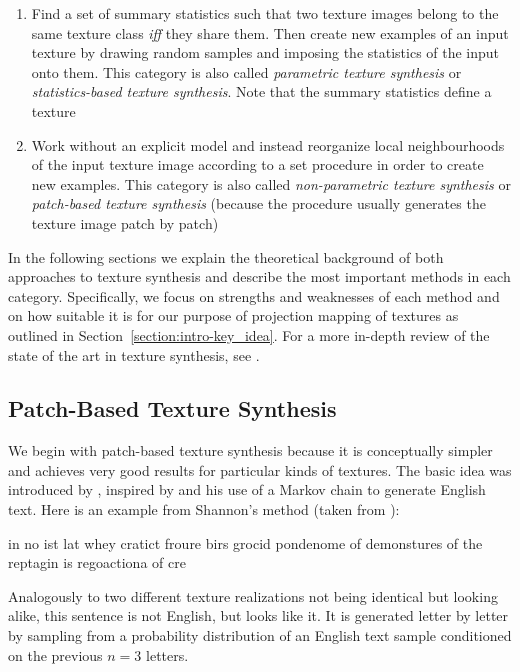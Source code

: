 \begin{enumerate}
    \item Find a set of summary statistics such that two texture images belong to the same texture class \textit{iff} they share them. Then create new examples of an input texture by drawing random samples and imposing the statistics of the input onto them. This category is also called \textit{parametric texture synthesis} or \textit{statistics-based texture synthesis}. Note that the summary statistics define a texture
    \item Work without an explicit model and instead reorganize local neighbourhoods of the input texture image according to a set procedure in order to create new examples. This category is also called \textit{non-parametric texture synthesis} or \textit{patch-based texture synthesis} (because the procedure usually generates the texture image patch by patch)
\end{enumerate}

In the following sections we explain the theoretical background of both approaches to texture synthesis and describe the most important methods in each category. Specifically, we focus on strengths and weaknesses of each method and on how suitable it is for our purpose of projection mapping of textures as outlined in Section~\ref{section:intro-key_idea}. For a more in-depth review of the state of the art in texture synthesis, see \citet{Raad2018}.

\subsection{Patch-Based Texture Synthesis}
\label{section:background-texture_synthesis-patch_based}

We begin with patch-based texture synthesis because it is conceptually simpler and achieves very good results for particular kinds of textures. The basic idea was introduced by \citet{Efros1999}, inspired by \citet{Shannon1948} and his use of a Markov chain to generate English text. Here is an example from Shannon's method (taken from \citet{Raad2018}):

\begin{displayquote}
    in no ist lat whey cratict froure birs grocid pondenome of demonstures of the reptagin is regoactiona of cre
\end{displayquote}

Analogously to two different texture realizations not being identical but looking alike, this sentence is not English, but looks like it. It is generated letter by letter by sampling from a probability distribution of an English text sample conditioned on the previous \(n = 3\) letters.

